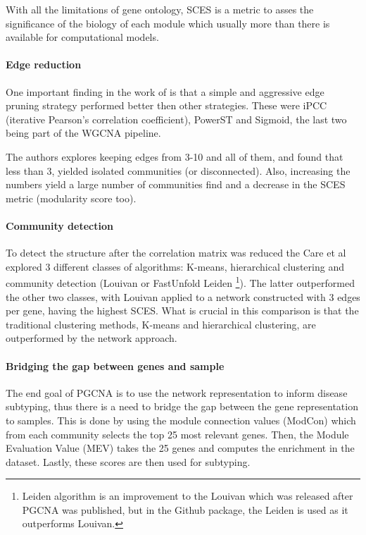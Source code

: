 With all the limitations of gene ontology, SCES is a metric to asses the significance of the biology of each module which usually more than there is available for computational models.

\paragraph*{Edge reduction}

One important finding in the work of \citet{Care2019-ij} is that a simple and aggressive edge pruning strategy performed better then other strategies. These were iPCC (iterative Pearson’s correlation coefficient), PowerST and Sigmoid, the last two being part of the WGCNA pipeline.

The authors explores keeping edges from 3-10 and all of them, and found that less than 3, yielded isolated communities (or disconnected). Also, increasing the numbers yield a large number of communities find and a decrease in the SCES metric (modularity score too).

\paragraph*{Community detection}

To detect the structure after the correlation matrix was reduced the Care et al explored 3 different classes of algorithms: K-means, hierarchical clustering and community detection (Louivan\citet{Blondel2008-ik} or FastUnfold Leiden \citet{Traag2019-ne}\footnote{Leiden algorithm is an improvement to the Louivan which was released after PGCNA was published, but in the Github package, the Leiden is used as it outperforms Louivan.}). The latter outperformed the other two classes, with Louivan applied to a network constructed with 3 edges per gene, having the highest SCES. What is crucial in this comparison is that the traditional clustering methods, K-means and hierarchical clustering, are outperformed by the network approach.

\paragraph*{Bridging the gap between genes and sample}

The end goal of PGCNA is to use the network representation to inform disease subtyping, thus there is a need to bridge the gap between the gene representation to samples. This is done by using the module connection values (ModCon) which from each community selects the top 25 most relevant genes. Then, the Module Evaluation Value (MEV) takes the 25 genes and computes the enrichment in the dataset. Lastly, these scores are then used for subtyping.

